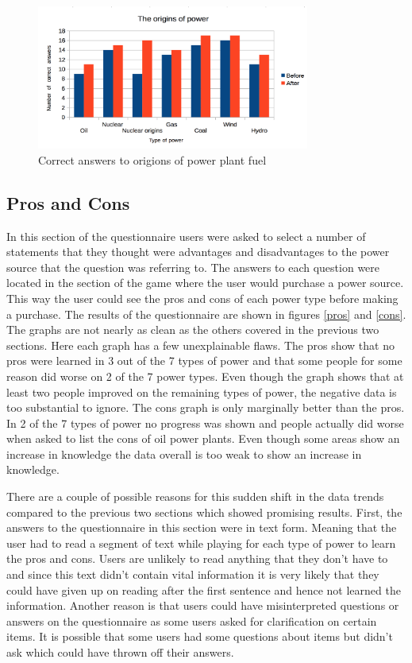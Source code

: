 \documentclass[msc,oneside]{ubcthesis}%
\begin{document}
  \begin{figure}[hbt]
  \begin{center}
    \includegraphics[width=0.8\textwidth]{survey_pics/post_and_pre/origins}
    \caption[Origions of power fuel]{Correct answers to origions of power plant fuel}\label{origins}
  \end{center}
\end{figure}

\subsection{Pros and Cons}
In this section of the questionnaire users were asked to select a number of statements that they thought were advantages and disadvantages to the power source that the question was referring to. The answers to each question were located in the section of the game where the user would purchase a power source. This way the user could see the pros and cons of each power type before making a purchase. The results of the questionnaire are shown in figures \ref{pros} and \ref{cons}. The graphs are not nearly as clean as the others covered in the previous two sections. Here each graph has a few unexplainable flaws. The pros show that no pros were learned in 3 out of the 7 types of power and that some people for some reason did worse on 2 of the 7 power types. Even though the graph shows that at least two people improved on the remaining types of power, the negative data is too substantial to ignore. The cons graph is only marginally better than the pros. In 2 of the 7 types of power no progress was shown and people actually did worse when asked to list the cons of oil power plants. Even though some areas show an increase in knowledge the data overall is too weak to show an increase in knowledge. 

\indent There are a couple of possible reasons for this sudden shift in the data trends compared to the previous two sections which showed promising results. First, the answers to the questionnaire in this section were in text form. Meaning that the user had to read a segment of text while playing for each type of power to learn the pros and cons. Users are unlikely to read anything that they don't have to and since this text didn't contain vital information it is very likely that they could have given up on reading after the first sentence and hence not learned the information. Another reason is that users could have misinterpreted questions or answers on the questionnaire as some users asked for clarification on certain items. It is possible that some users had some questions about items but didn't ask which could have thrown off their answers.
\end{document}
